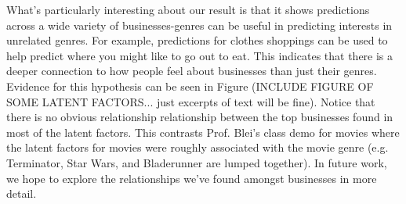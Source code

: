 What's particularly interesting about our result is that it shows predictions across a wide variety of businesses-genres can be useful in predicting interests in unrelated genres. For example, predictions for clothes shoppings can be used to help predict where you might like to go out to eat. This indicates that there is a deeper connection to how people feel about businesses than just their genres. Evidence for this hypothesis can be seen in Figure (INCLUDE FIGURE OF SOME LATENT FACTORS... just excerpts of text will be fine). Notice that there is no obvious relationship relationship between the top businesses found in most of the latent factors. This contrasts Prof. Blei's class demo for movies where the latent factors for movies were roughly associated with the movie genre (e.g. Terminator, Star Wars, and Bladerunner are lumped together). In future work, we hope to explore the relationships we've found amongst businesses in more detail.


